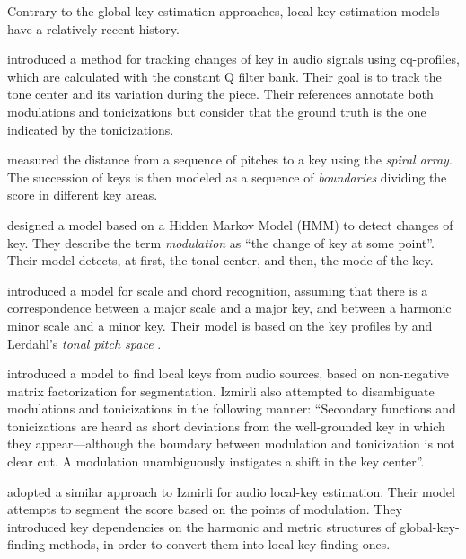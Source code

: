 


Contrary to the global-key estimation approaches, local-key
estimation models have a relatively recent history.

\textcite{purwins2000new} introduced a method for tracking
changes of key in audio signals using cq-profiles, which are
calculated with the constant Q filter bank. Their goal is to
track the tone center and its variation during the piece.
Their references annotate both modulations and tonicizations
but consider that the ground truth is the one indicated by
the tonicizations.

\textcite{chew2002spiral} measured the distance from a
sequence of pitches to a key using the \emph{spiral array}.
The succession of keys is then modeled as a sequence of
\emph{boundaries} dividing the score in different key areas.

\textcite{chai2005detection} designed a model based on a
Hidden Markov Model (HMM) to detect changes of key. They
describe the term \emph{modulation} as ``the change of key
at some point''. Their model detects, at first, the tonal
center, and then, the mode of the key.

\textcite{catteau2007probabilistic} introduced a model for
scale and chord recognition, assuming that there is a
correspondence between a major scale and a major key, and
between a harmonic minor scale and a minor key. Their model
is based on the key profiles by
\textcite{temperley1999whats} and Lerdahl's \emph{tonal
pitch space} \parencite{lerdahl2005tonal}.

\textcite{izmirli2007localized} introduced a model to find
local keys from audio sources, based on non-negative matrix
factorization for segmentation. Izmirli also attempted to
disambiguate modulations and tonicizations in the following
manner: ``Secondary functions and tonicizations are heard as
short deviations from the well-grounded key in which they
appear---although the boundary between modulation and
tonicization is not clear cut. A modulation unambiguously
instigates a shift in the key center''.

\textcite{papadopoulos2009local} adopted a similar approach
to Izmirli for audio local-key estimation. Their model
attempts to segment the score based on the points of
modulation. They introduced key dependencies on the harmonic
and metric structures of global-key-finding methods, in
order to convert them into local-key-finding ones.

